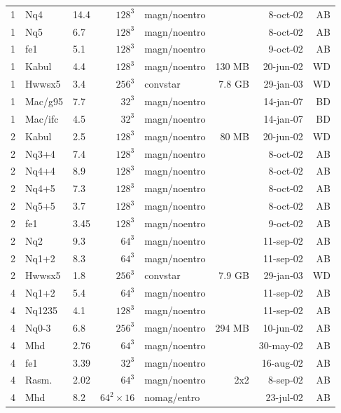 \documentclass[\mydriver,12pt,twoside,notitlepage,a4paper]{article}
\begin{document}
\begin{center}
\begin{small}
\begin{longtable}{rllrlrrr}
   1 & Nq4   &14.4  & $128^3$ & magn/noentro &        &  8-oct-02 & AB \\
   1 & Nq5   & 6.7  & $128^3$ & magn/noentro &        &  8-oct-02 & AB \\
   1 & fe1   & 5.1  & $128^3$ & magn/noentro &        &  9-oct-02 & AB \\
   1 & Kabul & 4.4  & $128^3$ & magn/noentro & 130 MB & 20-jun-02 & WD \\
   1 & Hwwsx5& 3.4  & $256^3$ & convstar     & 7.8 GB & 29-jan-03 & WD \\
   1 &Mac/g95& 7.7  & $32^3$  & magn/noentro &        & 14-jan-07 & BD \\
   1 &Mac/ifc& 4.5  & $32^3$  & magn/noentro &        & 14-jan-07 & BD \\
   2 & Kabul & 2.5  & $128^3$ & magn/noentro &  80 MB & 20-jun-02 & WD \\
   2 & Nq3+4 & 7.4  & $128^3$ & magn/noentro &        &  8-oct-02 & AB \\
   2 & Nq4+4 & 8.9  & $128^3$ & magn/noentro &        &  8-oct-02 & AB \\
   2 & Nq4+5 & 7.3  & $128^3$ & magn/noentro &        &  8-oct-02 & AB \\
   2 & Nq5+5 & 3.7  & $128^3$ & magn/noentro &        &  8-oct-02 & AB \\
   2 & fe1   & 3.45 & $128^3$ & magn/noentro &        &  9-oct-02 & AB \\
   2 & Nq2   & 9.3  &  $64^3$ & magn/noentro &        & 11-sep-02 & AB \\
   2 & Nq1+2 & 8.3  &  $64^3$ & magn/noentro &        & 11-sep-02 & AB \\
   2 & Hwwsx5& 1.8  & $256^3$ & convstar     & 7.9 GB & 29-jan-03 & WD \\
   4 & Nq1+2 & 5.4  &  $64^3$ & magn/noentro &        & 11-sep-02 & AB \\
   4 & Nq1235& 4.1  & $128^3$ & magn/noentro &        & 11-sep-02 & AB \\
   4 & Nq0-3 & 6.8  & $256^3$ & magn/noentro & 294 MB & 10-jun-02 & AB \\
   4 & Mhd   & 2.76 &  $64^3$ & magn/noentro &        & 30-may-02 & AB \\
   4 & fe1   & 3.39 &  $32^3$ & magn/noentro &        & 16-aug-02 & AB \\
   4 & Rasm. & 2.02 &  $64^3$ & magn/noentro &  2x2   &  8-sep-02 & AB \\
   4 & Mhd   & 8.2  &  $64^2\!\times\!16$
                              & nomag/entro &        & 23-jul-02 & AB \\

\end{longtable}
\end{small}
\end{center}
\end{document}
